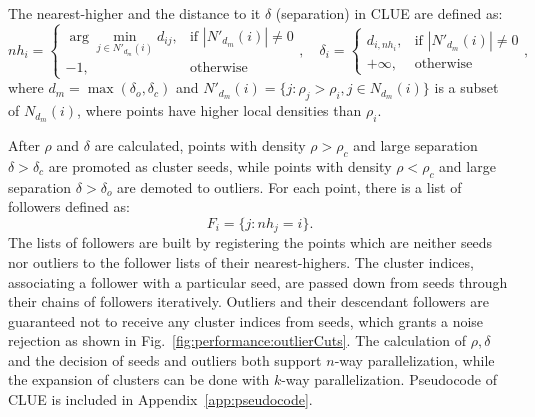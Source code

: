 The nearest-higher and the distance to it $\delta$ (separation) in CLUE are defined as:
\begin{equation} \label{eqn:algorithm:defineDelta}
    nh_i = 
    \begin{cases}
        \arg\min_{j \in N'_{d_m}(i) } d_{ij},   & \text{if } |N'_{d_m}(i)| \neq 0  \\
        -1,                                     & \text{otherwise}
    \end{cases}, 
    \quad
    \delta_i = 
    \begin{cases}
        d_{i,nh_i}, & \text{if }  |N'_{d_m}(i)| \neq 0 \\
        +\infty,    & \text{otherwise}
    \end{cases},
\end{equation}
\noindent where $d_m= \max (\delta_o, \delta_c)$ and $N'_{d_m}(i) = \{ j : \rho_j > \rho_i, j \in N_{d_m}(i) \}$ is a subset of $N_{d_m}(i)$, where points have higher local densities than $\rho_i$. 

After $\rho$ and $\delta$ are calculated, points with density $\rho>\rho_c$ and large separation $\delta>\delta_c$ are promoted as cluster seeds, while points with density $\rho<\rho_c$ and large separation $\delta>\delta_o$ are demoted to outliers. For each point, there is a list of followers defined as:
\begin{equation} \label{eqn:algorithm:defineFollowers}
    F_i = \{j : nh_j=i \}.
\end{equation}
\noindent The lists of followers are built by registering the points which are neither seeds nor outliers to the follower lists of their nearest-highers. The cluster indices, associating a follower with a particular seed, are passed down from seeds through their chains of followers iteratively. Outliers and their descendant followers are guaranteed not to receive any cluster indices from seeds, which grants a noise rejection as shown in Fig.~\ref{fig:performance:outlierCuts}. The calculation of $\rho, \delta$ and the decision of seeds and outliers both support $n$-way parallelization, while the expansion of clusters can be done with $k$-way parallelization.
Pseudocode of CLUE is included in Appendix~\ref{app:pseudocode}.




